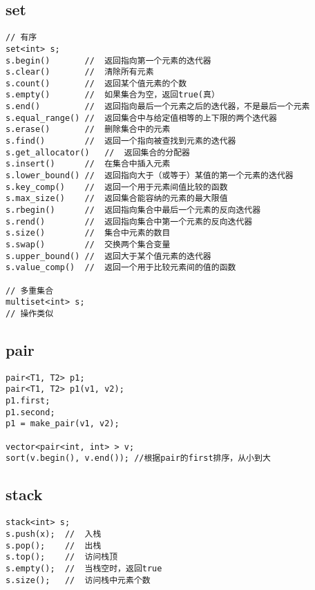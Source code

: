 \subsection{set}
\begin{lstlisting}
// 有序
set<int> s;
s.begin()       //  返回指向第一个元素的迭代器
s.clear()       //  清除所有元素
s.count()       //  返回某个值元素的个数
s.empty()       //  如果集合为空，返回true(真）
s.end()         //  返回指向最后一个元素之后的迭代器，不是最后一个元素
s.equal_range() //  返回集合中与给定值相等的上下限的两个迭代器
s.erase()       //  删除集合中的元素
s.find()        //  返回一个指向被查找到元素的迭代器
s.get_allocator()   //  返回集合的分配器
s.insert()      //  在集合中插入元素
s.lower_bound() //  返回指向大于（或等于）某值的第一个元素的迭代器
s.key_comp()    //  返回一个用于元素间值比较的函数
s.max_size()    //  返回集合能容纳的元素的最大限值
s.rbegin()      //  返回指向集合中最后一个元素的反向迭代器
s.rend()        //  返回指向集合中第一个元素的反向迭代器
s.size()        //  集合中元素的数目
s.swap()        //  交换两个集合变量
s.upper_bound() //  返回大于某个值元素的迭代器
s.value_comp()  //  返回一个用于比较元素间的值的函数

// 多重集合
multiset<int> s;
// 操作类似
\end{lstlisting}


\subsection{pair}
\begin{lstlisting}
pair<T1, T2> p1;
pair<T1, T2> p1(v1, v2);
p1.first;
p1.second;
p1 = make_pair(v1, v2);

vector<pair<int, int> > v;
sort(v.begin(), v.end()); //根据pair的first排序，从小到大
\end{lstlisting}


\subsection{stack}
\begin{lstlisting}
stack<int> s;
s.push(x);  //  入栈
s.pop();    //  出栈
s.top();    //  访问栈顶
s.empty();  //  当栈空时，返回true
s.size();   //  访问栈中元素个数
\end{lstlisting}


